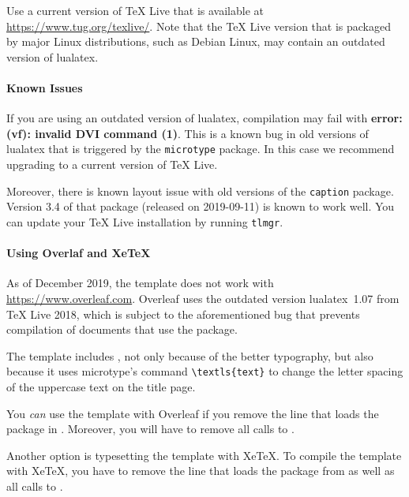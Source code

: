 Use a current version of TeX Live that is available at \url{https://www.tug.org/texlive/}. Note that the TeX Live version that is packaged by major Linux distributions, such as Debian Linux, may contain an outdated version of lualatex.

\paragraph{Known Issues}

If you are using an outdated version of lualatex, compilation may fail with \textbf{error: (vf): invalid DVI command (1)}. This is a known bug in old versions of lualatex that is triggered by the \texttt{microtype} package. In this case we recommend upgrading to a current version of TeX Live.

Moreover, there is known layout issue with old versions of the \texttt{caption} package. Version 3.4 of that package (released on 2019-09-11) is known to work well. You can update your TeX Live installation by running \texttt{tlmgr}.

\paragraph{Using Overlaf and XeTeX}

As of December 2019, the template does not work with \url{https://www.overleaf.com}. Overleaf uses the outdated version lualatex~1.07 from TeX Live 2018, which is subject to the aforementioned bug that prevents compilation of documents that use the  package.

The template includes , not only because of the better typography, but also because it uses microtype's command \verb|\textls{text}| to change the letter spacing of the uppercase text on the title page.

You \emph{can} use the template with Overleaf if you remove the line that loads the  package in . Moreover, you will have to remove all calls to .

Another option is typesetting the template with XeTeX. To compile the template with XeTeX, you have to remove the line that loads the package  from  as well as all calls to .


